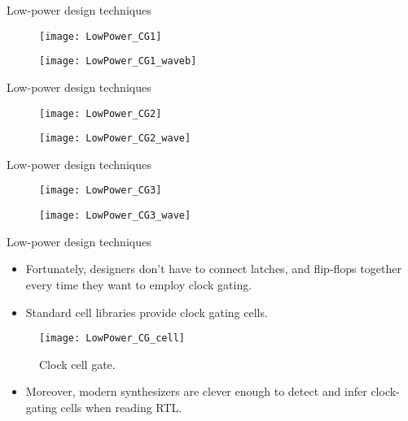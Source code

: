 \documentclass[]{slides}
\begin{document}
\begin{frame}{Low-power design techniques}{}
\vspace{-5pt}
\begin{figure}
\texttt{[image: LowPower\_CG1]}
\end{figure}
\vspace{-15pt}
\begin{figure}
\texttt{[image: LowPower\_CG1\_waveb]}
\end{figure}
\end{frame}

\begin{frame}{Low-power design techniques}{}
\vspace{-5pt}
\begin{figure}
\texttt{[image: LowPower\_CG2]}
\end{figure}
\vspace{-10pt}
\begin{figure}
\texttt{[image: LowPower\_CG2\_wave]}
\end{figure}
\end{frame}

\begin{frame}{Low-power design techniques}{}
\vspace{-5pt}
\begin{figure}
\texttt{[image: LowPower\_CG3]}
\end{figure}
\vspace{-10pt}
\begin{figure}
\texttt{[image: LowPower\_CG3\_wave]}
\end{figure}
\end{frame}

\begin{frame}{Low-power design techniques}{}
\begin{itemize}
\item Fortunately, designers don't have to connect latches,  and flip-flops together every time they want to employ clock gating.
\item Standard cell libraries provide clock gating cells.
\end{itemize}
\begin{figure}
\texttt{[image: LowPower\_CG\_cell]}
\caption{Clock cell gate.}
\label{Figure:CG_cell}
\end{figure}
\begin{itemize}
\item Moreover, modern synthesizers are clever enough to detect and infer clock-gating cells when reading \ac{RTL}. 
\end{itemize}
\end{frame}
\end{document}
